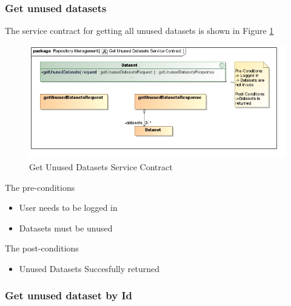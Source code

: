 \subsubsection {Get unused datasets}
The service contract for getting all unused datasets is shown in Figure \ref{fig:getUnusedDatasetsService}
\begin{figure}[H]
  \begin{center}
  \includegraphics[scale=0.6]{../Diagrams and Charts/Test Data/Get Unused Datasets Service Contract.jpg}
  \caption{Get Unused Datasets Service Contract}
  \label{fig:getUnusedDatasetsService}
  \end{center}
  
\end{figure}

The pre-conditions
\begin{itemize}
  \item User needs to be logged in
  \item Datasets must be unused
\end{itemize}

The post-conditions
\begin{itemize}
  \item Unused Datasets Succesfully returned
\end{itemize}
\subsubsection {Get unused dataset by Id}

